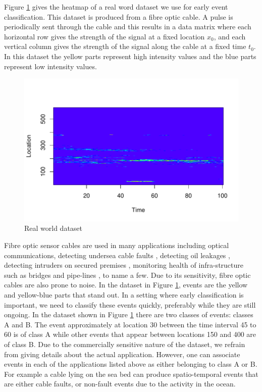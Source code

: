 \documentclass[a4paper,11pt]{article}
\begin{document}
Figure \ref{fig:Real_World_Data} gives the heatmap of a real word dataset we use for early event classification. This dataset is produced from a fibre optic cable. A pulse is periodically sent through the cable and this results in a data matrix where each horizontal row gives the strength of the signal at a fixed location $x_0$, and each vertical column gives the strength of the signal along the cable at a fixed time $t_0$. In this dataset the yellow parts represent high intensity values and the blue parts represent low intensity values.

\begin{figure}[H]
	\centering
	\includegraphics{./Graphics/Real_World.pdf} %
	\caption{\footnotesize Real world dataset}
	\label{fig:Real_World_Data}
\end{figure}

Fibre optic sensor cables are used in many applications including optical communications, detecting undersea cable faults \cite{jiang2009technological}, detecting oil leakages \cite{nikles2004leakage}, detecting intruders on secured premises \cite{griffiths1995developments}, monitoring health of infra-structure such as bridges and pipe-lines \cite{li2004recent}, to name a few. Due to its sensitivity, fibre optic cables are also prone to noise. In the dataset in Figure \ref{fig:Real_World_Data}, events are the yellow and yellow-blue parts that stand out. In a setting where early classification is important, we need to classify these events quickly, preferably while they are still ongoing. In the dataset shown in Figure \ref{fig:Real_World_Data} there are two classes of events: classes A and B. The event approximately at location 30 between the time interval 45 to 60 is of class A while other events that appear between locations 150 and 400 are of class B. Due to the commercially sensitive nature of the dataset, we refrain from giving details about the actual application. However, one can associate events in each of the applications listed above as either belonging to class A or B. For example a cable lying on the sea bed can produce spatio-temporal events that are either cable faults, or non-fault events due to the activity in the ocean.
\end{document}
